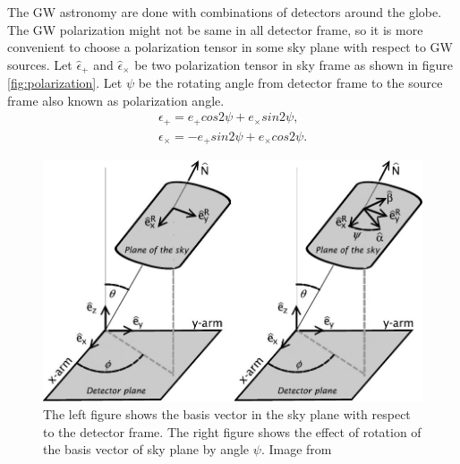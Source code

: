 \documentclass{ttuthes2007}
\begin{document}
	The \ac{GW} astronomy are done with combinations of detectors around the
globe. The \ac{GW} polarization might not be same in all detector frame, so it
is more convenient to choose a polarization tensor in some sky plane with respect
to \ac{GW} sources. Let $\hat\epsilon_+$ and $\hat\epsilon_\times$ be two polarization
tensor in sky frame as shown in figure \ref{fig:polarization}. Let $\psi$ be the rotating angle from
detector frame to the source frame also known as polarization angle.
\begin{equation}
\begin{aligned}
\epsilon_+ = e_+cos2\psi + e_\times sin2\psi, \\
\epsilon_\times = -e_+sin2\psi + e_\times cos2\psi.
\end{aligned}
\end{equation}
\begin{figure}[h!]
	\includegraphics[width=\textwidth]{figure/antennae.jpg}
	\caption{The left figure shows the basis vector in the sky plane with
respect to the detector frame. The right figure shows the effect of rotation of
the basis vector of sky plane by angle $\psi$. Image from
~\cite{Sathyaprakash_2009}}
\end{figure}  
\end{document}
